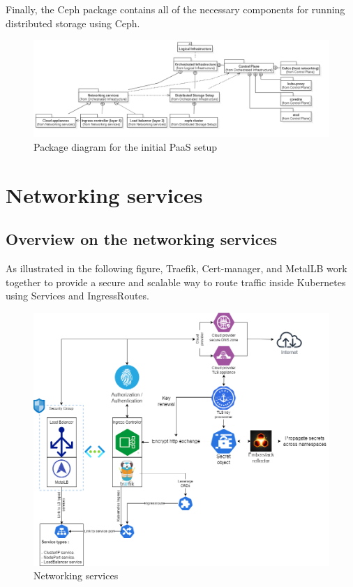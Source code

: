 Finally, the Ceph package contains all of the necessary components for running distributed storage using Ceph.

\begin{figure}[H]\centering
\includegraphics[width=1.0\textwidth,angle=00]{assets/f21.png}
\caption{ Package diagram for the initial PaaS setup }
\label{fig:package diagram for the initial PaaS setup}
\end{figure}

\section{Networking services}

\subsection{Overview on the networking services}

As illustrated in the following figure, Traefik, Cert-manager, and MetalLB work together to provide a secure and scalable way to route traffic inside Kubernetes using Services and IngressRoutes.

\begin{figure}[H]\centering
\includegraphics[width=1.0\textwidth,angle=00]{assets/f22.png}
\caption{ Networking services}
\label{fig:Networking services}
\end{figure}


